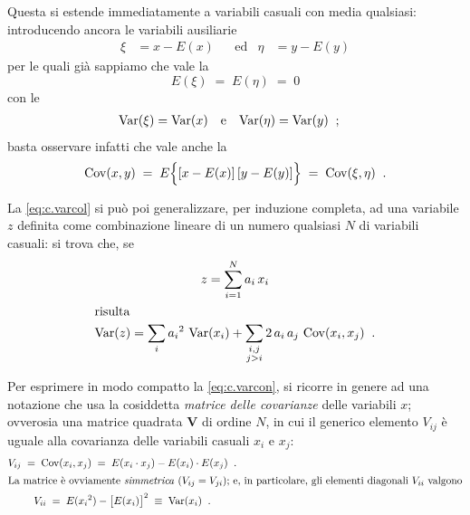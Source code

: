 Questa si estende immediatamente a variabili casuali con
media qualsiasi: introducendo ancora le variabili ausiliarie
\begin{align*}
  \xi &= x - E(x) && \text{ed} &
  \eta &= y - E(y)
\end{align*}
per le quali gi\`a sappiamo che vale la
\begin{equation*}
  E(\xi) \; = \; E(\eta) \; = \; 0
\end{equation*}
con le
\begin{align*}
  \operatorname{Var} (\xi) &= \operatorname{Var} (x) && \text{e} &
  \operatorname{Var} (\eta) &= \operatorname{Var} (y) \;\; ;
\end{align*}
basta osservare infatti che vale anche la
\begin{equation*}
  \operatorname{Cov} (x, y) \; = \;
    E \Bigl \{ \left[ \vphantom{y} x - E(x)
    \right] \left[ y - E(y) \right] \Bigr \}
    \; = \; \operatorname{Cov} (\xi, \eta) \;\; .
\end{equation*}

La \eqref{eq:c.varcol} si pu\`o poi generalizzare, per
induzione completa, ad una variabile $z$ definita come
combinazione lineare di un numero qualsiasi $N$ di variabili
casuali: si trova che, se
\begin{gather}
  z = \sum_{i=1}^N a_i \, x_i \notag \\
  \intertext{risulta}
  \operatorname{Var}(z) = \sum_i {a_i}^2 \, \operatorname{Var}(x_i) +
    \sum_{\substack{i,j \\ j > i}} 2 \, a_i \, a_j \,
    \operatorname{Cov}(x_i , x_j) \;\; . \label{eq:c.varcon}
\end{gather}

%
Per esprimere in modo compatto la \eqref{eq:c.varcon}, si
ricorre in genere ad una notazione che usa la cosiddetta
\emph{matrice delle covarianze} delle variabili $x$;
ovverosia una matrice quadrata $\boldsymbol{V}$ di ordine
$N$, in cui il generico elemento $V_{ij}$ \`e uguale alla
covarianza delle variabili casuali $x_i$ e $x_j$:
\begin{gather}
  V_{ij} \; = \; \operatorname{Cov}(x_i, x_j) \; = \; E (x_i \cdot
  x_j) - E(x_i) \cdot E(x_j) \;\; . \label{eq:c.matcov} \\
  \intertext{La matrice \`e ovviamente
    \emph{simmetrica} ($V_{ij} = V_{ji}$); e, in
    particolare, gli elementi diagonali $V_{ii}$
    valgono}
  V_{ii} \; = \; E( {x_i}^2 ) - \bigl[ E (x_i)
    \bigr]^2 \; \equiv \; \operatorname{Var}(x_i) \;\; . \notag
\end{gather}%

